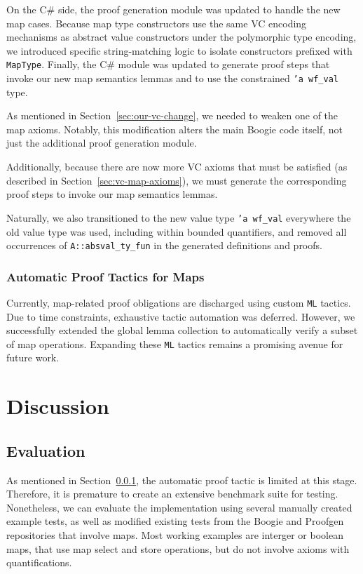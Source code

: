 \documentclass[11pt]{article}
\begin{document}
On the C\# side, the proof generation module was updated to handle the new map cases.
Because map type constructors use the same VC encoding mechanisms as abstract value constructors under the polymorphic type encoding,
we introduced specific string-matching logic to isolate constructors prefixed with \texttt{MapType}.
Finally, the C\# module was updated to generate proof steps that invoke our new map semantics lemmas
and to use the constrained \texttt{'a wf\_val} type.

As mentioned in Section~\ref{sec:our-vc-change}, we needed to weaken one of the map axioms.
Notably, this modification alters the main Boogie code itself, not just the additional proof generation module.

Additionally, because there are now more VC axioms that must be satisfied
(as described in Section~\ref{sec:vc-map-axioms}),
we must generate the corresponding proof steps to invoke our map semantics lemmas.

Naturally, we also transitioned to the new value type \texttt{'a wf\_val}
everywhere the old value type was used, including within bounded quantifiers,
and removed all occurrences of \texttt{A::absval\_ty\_fun} in the generated definitions and proofs.


\subsubsection{Automatic Proof Tactics for Maps}
\label{sec:proof-tactics-map}

Currently, map-related proof obligations are discharged using custom \texttt{ML} tactics.
Due to time constraints, exhaustive tactic automation was deferred.
However, we successfully extended the global lemma collection to automatically verify a subset of map operations.
Expanding these \texttt{ML} tactics remains a promising avenue for future work.


\section{Discussion}
\label{sec:discussion}

\subsection{Evaluation}

As mentioned in Section~\ref{sec:proof-tactics-map},
the automatic proof tactic is limited at this stage.
Therefore, it is premature to create an extensive benchmark suite for testing.
Nonetheless, we can evaluate the implementation using several manually created example tests,
as well as modified existing tests from the Boogie and Proofgen repositories that involve maps.
Most working examples are interger or boolean maps,
that use map select and store operations,
but do not involve axioms with quantifications.
\end{document}
